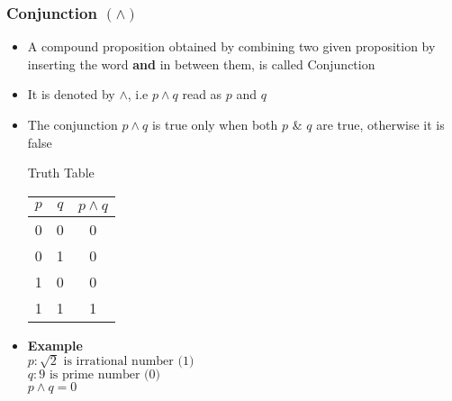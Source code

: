 \documentclass{article}
\begin{document}
	\subsubsection{Conjunction $(\land)$}
	\begin{itemize}
		\item A compound proposition obtained by combining two given proposition by inserting the word
			\textbf{and} in between them, is called Conjunction
		\item It is denoted by $\land$, i.e $p\land q$ read as $p$ and $q$
		\item The conjunction $p\land q$ is true only when both $p$ \& $q$ are true, otherwise it is
			false
			\begin{center}
				Truth Table \\ \vspace{1em}
				\begin{tabular}{|c|c|c|} \hline
					$p$ &  $q$ & $p\land q$ \\ \hline
					0 & 0 & 0 \\
					0 & 1 & 0 \\
					1 & 0 & 0 \\
					1 & 1 & 1 \\ \hline
				\end{tabular}
			\end{center}
		\item \textbf{Example} \\
			$p : \sqrt{2}\text{ is irrational number (1)}$ \\
			$q : 9\text{ is prime number (0)}$ \\
			$p\land q=0$
	\end{itemize}
\end{document}
